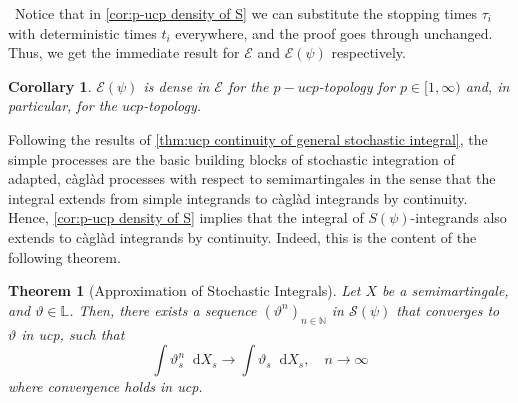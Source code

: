 \documentclass[11pt]{report}
\newcommand{\diff}{\mathop{}\!\mathrm{d}}
\theoremstyle{plain} %
\newtheorem{theorem}{Theorem}[chapter]
\newtheorem{corollary}[corollary]{Corollary}
\theoremstyle{definition} %
\theoremstyle{remark} %
\begin{document}
\
Notice that in \cref{cor:p-ucp density of S} we can substitute the stopping times \(\tau_i\) with deterministic times \(t_i\) everywhere, and the proof goes through unchanged. Thus, we get the immediate result for \(\mathcal{E}\) and \(\mathcal{E}(\psi)\) respectively.
\begin{corollary}\label{cor:ucp and p-ucp density of E}
    \(\mathcal{E}(\psi)\) is dense in \(\mathcal{E}\) for the \(p-ucp\)-topology for \(p\in[1,\infty)\) and, in particular, for the \(ucp\)-topology.
\end{corollary}
Following the results of \cref{thm:ucp continuity of general stochastic integral}, the simple processes are the basic building blocks of stochastic integration of adapted, càglàd processes with respect to semimartingales in the sense that the integral extends from simple integrands to càglàd integrands by continuity. Hence, \cref{cor:p-ucp density of S} implies that the integral of \(S(\psi)\)-integrands also extends to càglàd integrands by continuity. Indeed, this is the content of the following theorem.
\begin{theorem}[Approximation of Stochastic Integrals]\label{thm:Approx of stoch. Integrals}
    Let \(X\) be a semimartingale, and \(\vartheta\in \mathbb{L}\). Then, there exists a sequence \((\vartheta^n)_{n\in\mathbb{N}}\) in \(\mathcal{S}(\psi)\) that converges to \(\vartheta\) in ucp, such that
    \begin{equation}
        \int \vartheta_s^n\diff X_s \to \int \vartheta_s\diff X_s,\quad n\to\infty
    \end{equation}
    where convergence holds in ucp.
\end{theorem}
\end{document}
